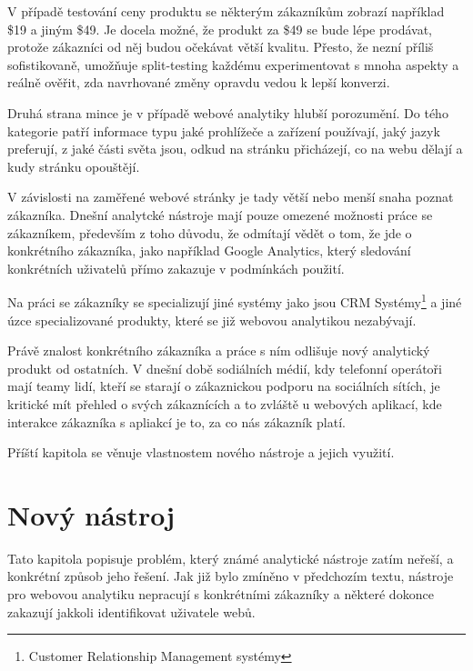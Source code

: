 \documentclass[bc,female,java,dept456]{diploma}						%
\begin{document}
V případě testování ceny produktu se některým zákazníkům zobrazí například \$19 a jiným \$49. Je docela možné, že produkt za \$49 se bude lépe prodávat, protože zákazníci od něj budou očekávat větší kvalitu. Přesto, že nezní příliš sofistikovaně, umožňuje split-testing každému experimentovat s mnoha aspekty a reálně ověřit, zda navrhované změny opravdu vedou k lepší konverzi.




Druhá strana mince je v případě webové analytiky hlubší porozumění. Do tého kategorie patří informace typu jaké prohlížeče a zařízení používají, jaký jazyk preferují, z jaké části světa jsou, odkud na stránku přicházejí, co na webu dělají a kudy stránku opouštějí. 

V závislosti na zaměřené webové stránky je tady větší nebo menší snaha poznat zákazníka. Dnešní analytcké nástroje mají pouze omezené možnosti práce se zákazníkem, především z toho důvodu, že odmítají vědět o tom, že jde o konkrétního zákazníka, jako například Google Analytics, který sledování konkrétních uživatelů přímo zakazuje v podmínkách použití.

Na práci se zákazníky se specializují jiné systémy jako jsou CRM Systémy\footnote{Customer Relationship Management systémy} a jiné úzce specializované produkty, které se již webovou analytikou nezabývají. 

Právě znalost konkrétního zákazníka a práce s ním odlišuje nový analytický produkt od ostatních. V dnešní době sodiálních médií, kdy telefonní operátoři mají teamy lidí, kteří se starají o zákaznickou podporu na sociálních sítích, je kritické mít přehled o svých zákaznících a to zvláště u webových aplikací, kde interakce zákazníka s apliakcí je to, za co nás zákazník platí.

Příští kapitola se věnuje vlastnostem nového nástroje a jejich využití.





\section{Nový nástroj}

Tato kapitola popisuje problém, který známé analytické nástroje zatím neřeší, a konkrétní způsob jeho řešení. Jak již bylo zmíněno v předchozím textu, nástroje pro webovou analytiku nepracují s konkrétními zákazníky a některé dokonce zakazují jakkoli identifikovat uživatele webů.
\end{document}
